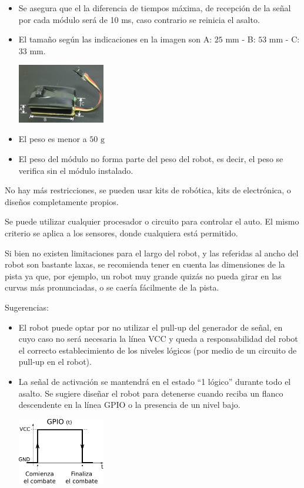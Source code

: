 \documentclass[a4paper,11pt]{article}
\newcommand{\mm}{\ensuremath{\mbox{~mm}}}
\newcommand{\gramos}{\ensuremath{\mbox{~g}}}
\begin{document}
\begin{itemize}
  \item Se asegura que el la diferencia de tiempos máxima, de recepción de la señal por cada módulo será de 10 ms, caso contrario se reinicia el asalto.
  \item El tamaño según las indicaciones en la imagen son A: $25\mm$ - B: $53\mm$ - C: $33\mm$.
  \begin{center}
    \includegraphics[width=0.3\textwidth]{signalstarter_img}
  \end{center}
  \item El peso es menor a $50\gramos$
  \item El peso del módulo no forma parte del peso del robot, es decir, el peso se verifica sin el módulo instalado.
\end{itemize}

No hay más restricciones, se pueden usar kits de robótica, kits de electrónica, o diseños completamente propios.

Se puede utilizar cualquier procesador o circuito para controlar el auto. El mismo criterio se aplica a los sensores, donde cualquiera está permitido.

Si bien no existen limitaciones para el largo del robot, y las referidas al ancho del robot son bastante laxas, se recomienda tener en cuenta las dimensiones de la pista ya que, por ejemplo, un robot muy grande quizás no pueda girar en las curvas más pronunciadas, o se caería fácilmente de la pista.

Sugerencias:
\begin{itemize}
  \item El robot puede optar por no utilizar el pull-up del generador de señal, en cuyo caso no será necesaria la línea VCC y queda a responsabilidad del robot el correcto establecimiento de los niveles lógicos (por medio de un circuito de pull-up en el robot).
  \item La señal de activación se mantendrá en el estado ``1 lógico'' durante todo el asalto. Se sugiere diseñar el robot para detenerse cuando reciba un flanco descendente en la línea GPIO o la presencia de un nivel bajo.
  \begin{center}
    \includegraphics[width=0.3\textwidth]{signalstarter_tiempos}
  \end{center}
\end{itemize}
\end{document}
